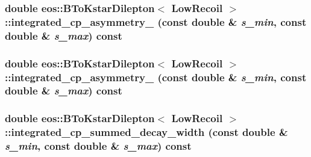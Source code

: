 \label{classeos_1_1BToKstarDilepton_3_01LowRecoil_01_4_a087f366b330084ec2b2476aee279ba18}
\hypertarget{classeos_1_1BToKstarDilepton_3_01LowRecoil_01_4_a5c84df702d00df7affbc7c597f55f6f3}{
\subsubsection[{integrated\_\-cp\_\-asymmetry\_\-2}]{\setlength{\rightskip}{0pt plus 5cm}double eos::BToKstarDilepton$<$ {\bf LowRecoil} $>$::integrated\_\-cp\_\-asymmetry\_ (const double \& {\em s\_\-min}, \/  const double \& {\em s\_\-max}) const}}
\label{classeos_1_1BToKstarDilepton_3_01LowRecoil_01_4_a5c84df702d00df7affbc7c597f55f6f3}
\hypertarget{classeos_1_1BToKstarDilepton_3_01LowRecoil_01_4_ad4a173a76138ee816326a381ec1946d8}{
\subsubsection[{integrated\_\-cp\_\-asymmetry\_\-3}]{\setlength{\rightskip}{0pt plus 5cm}double eos::BToKstarDilepton$<$ {\bf LowRecoil} $>$::integrated\_\-cp\_\-asymmetry\_ (const double \& {\em s\_\-min}, \/  const double \& {\em s\_\-max}) const}}
\label{classeos_1_1BToKstarDilepton_3_01LowRecoil_01_4_ad4a173a76138ee816326a381ec1946d8}
\hypertarget{classeos_1_1BToKstarDilepton_3_01LowRecoil_01_4_a0dc18658255a6b4bd15c91bd99020a57}{
\subsubsection[{integrated\_\-cp\_\-summed\_\-decay\_\-width}]{\setlength{\rightskip}{0pt plus 5cm}double eos::BToKstarDilepton$<$ {\bf LowRecoil} $>$::integrated\_\-cp\_\-summed\_\-decay\_\-width (const double \& {\em s\_\-min}, \/  const double \& {\em s\_\-max}) const}}
